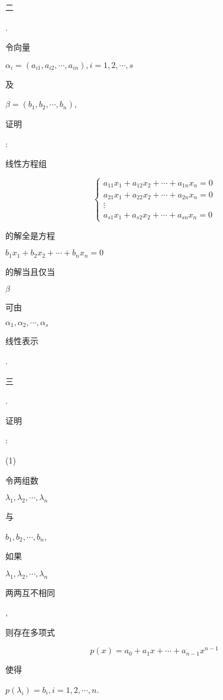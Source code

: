 \documentclass[10pt]{article}
\begin{document}
\begin{CJK}{UTF8}{mj}二\end{CJK}. \begin{CJK}{UTF8}{mj}令向量\end{CJK} $\alpha_{i}=\left(a_{i 1}, a_{i 2}, \cdots, a_{i n}\right), i=1,2, \cdots, s$ \begin{CJK}{UTF8}{mj}及\end{CJK} $\beta=\left(b_{1}, b_{2}, \cdots, b_{n}\right)$, \begin{CJK}{UTF8}{mj}证明\end{CJK}: \begin{CJK}{UTF8}{mj}线性方程组\end{CJK}
$$
\left\{\begin{array}{l}
a_{11} x_{1}+a_{12} x_{2}+\cdots+a_{1 n} x_{n}=0 \\
a_{21} x_{1}+a_{22} x_{2}+\cdots+a_{2 n} x_{n}=0 \\
\vdots \\
a_{s 1} x_{1}+a_{s 2} x_{2}+\cdots+a_{s n} x_{n}=0
\end{array}\right.
$$
\begin{CJK}{UTF8}{mj}的解全是方程\end{CJK} $b_{1} x_{1}+b_{2} x_{2}+\cdots+b_{n} x_{n}=0$ \begin{CJK}{UTF8}{mj}的解当且仅当\end{CJK} $\beta$ \begin{CJK}{UTF8}{mj}可由\end{CJK} $\alpha_{1}, \alpha_{2}, \cdots, \alpha_{s}$ \begin{CJK}{UTF8}{mj}线性表示\end{CJK}.

\begin{CJK}{UTF8}{mj}三\end{CJK}. \begin{CJK}{UTF8}{mj}证明\end{CJK}:

(1) \begin{CJK}{UTF8}{mj}令两组数\end{CJK} $\lambda_{1}, \lambda_{2}, \cdots, \lambda_{n}$ \begin{CJK}{UTF8}{mj}与\end{CJK} $b_{1}, b_{2}, \cdots, b_{n}$, \begin{CJK}{UTF8}{mj}如果\end{CJK} $\lambda_{1}, \lambda_{2}, \cdots, \lambda_{n}$ \begin{CJK}{UTF8}{mj}两两互不相同\end{CJK}, \begin{CJK}{UTF8}{mj}则存在多项式\end{CJK}
$$
p(x)=a_{0}+a_{1} x+\cdots+a_{n-1} x^{n-1}
$$
\begin{CJK}{UTF8}{mj}使得\end{CJK} $p\left(\lambda_{i}\right)=b_{i}, i=1,2, \cdots, n$.
\end{document}
